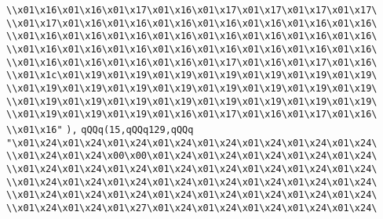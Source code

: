 \verb|\\x01\x16\x01\x16\x01\x17\x01\x16\x01\x17\x01\x17\x01\x17\x01\x17\|\newline
\verb|\\x01\x17\x01\x16\x01\x16\x01\x16\x01\x16\x01\x16\x01\x16\x01\x16\|\newline
\verb|\\x01\x16\x01\x16\x01\x16\x01\x16\x01\x16\x01\x16\x01\x16\x01\x16\|\newline
\verb|\\x01\x16\x01\x16\x01\x16\x01\x16\x01\x16\x01\x16\x01\x16\x01\x16\|\newline
\verb|\\x01\x16\x01\x16\x01\x16\x01\x16\x01\x17\x01\x16\x01\x17\x01\x16\|\newline
\verb|\\x01\x1c\x01\x19\x01\x19\x01\x19\x01\x19\x01\x19\x01\x19\x01\x19\|\newline
\verb|\\x01\x19\x01\x19\x01\x19\x01\x19\x01\x19\x01\x19\x01\x19\x01\x19\|\newline
\verb|\\x01\x19\x01\x19\x01\x19\x01\x19\x01\x19\x01\x19\x01\x19\x01\x19\|\newline
\verb|\\x01\x19\x01\x19\x01\x19\x01\x16\x01\x17\x01\x16\x01\x17\x01\x16\|\newline
\verb|\\x01\x16"|\newline
\verb|),|\newline
\verb|qQQq(15,qQQq129,qQQq|\newline
\verb|"\x01\x24\x01\x24\x01\x24\x01\x24\x01\x24\x01\x24\x01\x24\x01\x24\|\newline
\verb|\\x01\x24\x01\x24\x00\x00\x01\x24\x01\x24\x01\x24\x01\x24\x01\x24\|\newline
\verb|\\x01\x24\x01\x24\x01\x24\x01\x24\x01\x24\x01\x24\x01\x24\x01\x24\|\newline
\verb|\\x01\x24\x01\x24\x01\x24\x01\x24\x01\x24\x01\x24\x01\x24\x01\x24\|\newline
\verb|\\x01\x24\x01\x24\x01\x24\x01\x24\x01\x24\x01\x24\x01\x24\x01\x24\|\newline
\verb|\\x01\x24\x01\x24\x01\x27\x01\x24\x01\x24\x01\x24\x01\x24\x01\x24\|\newline
